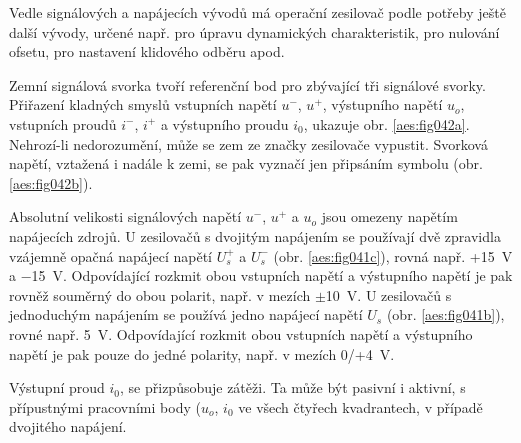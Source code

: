       Vedle signálových a napájecích vývodů má operační zesilovač podle potřeby ještě další vývody,
      určené např. pro úpravu dynamických charakteristik, pro nulování ofsetu, pro nastavení
      klidového odběru apod.

      Zemní signálová svorka tvoří referenční bod pro zbývající tři signálové svorky. Přiřazení
      kladných smyslů vstupních napětí \(u^-\), \(u^+\), výstupního napětí \(u_o\), vstupních proudů
      \(i^-\), \(i^+\) a výstupního proudu \(i_0\), ukazuje obr. \ref{aes:fig042a}. Nehrozí-li
      nedorozumění, může se zem ze značky zesilovače vypustit. Svorková napětí, vztažená i nadále k
      zemi, se pak vyznačí jen připsáním symbolu (obr. \ref{aes:fig042b}).

      Absolutní velikosti signálových napětí \(u^-\), \(u^+\) a \(u_o\) jsou omezeny napětím
      napájecích zdrojů. U zesilovačů s dvojitým napájením se používají dvě zpravidla vzájemně
      opačná napájecí napětí \(U_s^+\) a \(U_s^-\) (obr. \ref{aes:fig041c}), rovná např.
      +\qty{+15}{\volt} a \qty{-15}{\volt}. Odpovídající rozkmit obou vstupních napětí a výstupního
      napětí je pak rovněž souměrný do obou polarit, např. v mezích \(\pm\)\qty{10}{\volt}. U
      zesilovačů s jednoduchým napájením se používá jedno napájecí napětí \(U_s\) (obr.
      \ref{aes:fig041b}), rovné např. \qty{5}{\volt}. Odpovídající rozkmit obou vstupních napětí a
      výstupního napětí je pak pouze do jedné polarity, např. v mezích \num{0}/+\qty{4}{\volt}.

      Výstupní proud \(i_0\), se přizpůsobuje zátěži. Ta může být pasivní i aktivní, s přípustnými
      pracovními body (\(u_o\), \(i_0\) ve všech čtyřech kvadrantech, v případě dvojitého napájení.

